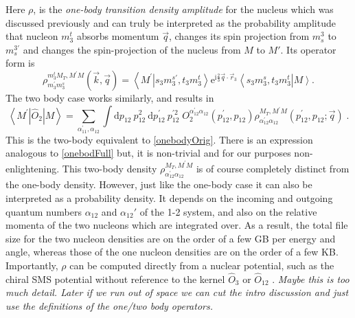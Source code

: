 \documentclass[a4paper,11pt]{article}
\newcommand\bv[1]{\vec{#1}}
\newcommand{\ques}[1]{\color{red}\textit{ #1 }\color{black}}
\begin{document}
Here $\rho$, is the \textit{one-body transition density amplitude}
for the nucleus which was discussed previously and can truly be
interpreted as the probability amplitude that nucleon $m_3^t$ absorbs
momentum $\bv{q}$, changes its spin projection from $m_s^3$ to
$m_s^{3'}$ and changes the spin-projection of the nucleus from $M$ to
$M'$. Its operator form is
\begin{equation}
  \rho_{m_{3}^{\prime} m_{3}^{s}}^{m_{3}^{t} M_{T}, M^{\prime}
  M}(\bv{k}, \bv{q})=\left\langle M^{\prime}\right.\left|s_{3}
  m_{3}^{s \prime}, t_{3} m_{3}^{t}\right\rangle
  \mathrm{e}^{\mathrm{i} \frac{2}{3} \bv{q} \cdot
  \bv{r}_{3}}\left\langle s_{3} m_{3}^{s}, t_{3}
  m_{3}^{t}\right|\left. M\right\rangle\label{onebodydens}.
\end{equation}
The two body case works similarly, and results in
\begin{equation}
  \left\langle M^{\prime}\left|\hat{O}_{2}\right| M\right\rangle =
  \sum_{\alpha_{11}^{\prime}, \alpha_{12}} \int \mathrm{d} p_{12}\:
  p_{12}^{2} \mathrm{~d} p_{12}^{\prime}\: p_{12}^{\prime 2}\;
  O_{2}^{\alpha_{12}^{\prime} \alpha_{12}}\left(p_{12}^{\prime},
  p_{12}\right) \rho_{\alpha_{12}^{\prime} \alpha_{12}}^{M_{T},
  M^{\prime} M}\left(p_{12}^{\prime}, p_{12} ; \bv{q}\right)\label{twobody}\;.
\end{equation}
This is the two-body equivalent to \eqref{onebodyOrig}.
There is an expression analogous to \eqref{onebodFull} but, it is non-trivial and for our purposes non-enlightening.
This two-body density $\rho_{\alpha_{12}^{\prime}
\alpha_{12}}^{M_{T}, M^{\prime} M}$ is of course completely distinct
from the one-body density. 
However, just like the one-body case it can also be interpreted as a probability density.
It depends on the incoming and outgoing quantum numbers
$\alpha_{12}$ and $\alpha_{12}'$ of the 1-2 system, and also on the
relative momenta of the two nucleons which are integrated over.
As a result, the total file size for the two nucleon densities are on
the order of a few GB per energy and angle, whereas those of the one
nucleon densities are on the order of a few KB.
Importantly, $\rho$ can be computed directly from a nuclear
potential, such as the chiral SMS potential
without reference to the kernel $\hat{O}_3$ or $\hat{O}_{12}$
\cite{Reinert2018}.
\ques{Maybe this is too much detail. Later if we run out of space we can cut the intro discussion and just use the definitions
of the one/two body operators.}
\end{document}
